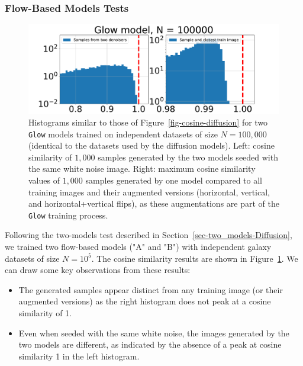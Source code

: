 \documentclass[fleqn,usenatbib]{mnras}
\begin{document}
\subsubsection{Flow-Based Models Tests}
\label{sec-two_models-Flow}
%
\begin{figure}
    \centering
    \includegraphics[width=\linewidth]{fig-glow-cosine-AB_ATrain.pdf}
    \caption{Histograms similar to those of Figure~\ref{fig-cosine-diffusion} for two \texttt{Glow} models trained on independent datasets of size $N=100,000$ (identical to the datasets used by the diffusion models). 
    Left: cosine similarity of $1,000$ samples generated by the two models seeded with the same white noise image. 
    Right: maximum cosine similarity values of $1,000$ samples generated by one model compared to all training images and their augmented versions (horizontal, vertical, and horizontal+vertical flips), as these augmentations are part of the \texttt{Glow} training process.}
    \label{fig-cosine-glow}
\end{figure}

Following the two-models test described in Section~\ref{sec-two_models-Diffusion}, we trained two flow-based models ("A" and "B") with independent galaxy datasets of size $N=10^5$. The cosine similarity results are shown in Figure~\ref{fig-cosine-glow}. We can draw some key observations from these results:
\begin{itemize}
    \item The generated samples appear distinct from any training image (or their augmented versions) as the right histogram does not peak at a cosine similarity of 1. 
    \item Even when seeded with the same white noise, the images generated by the two models are different, as indicated by the absence of a peak at cosine similarity 1 in the left histogram.
\end{itemize}
\end{document}
